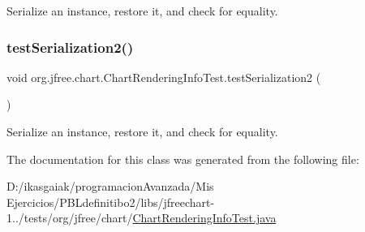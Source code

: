 Serialize an instance, restore it, and check for equality. \mbox{\label{classorg_1_1jfree_1_1chart_1_1_chart_rendering_info_test_a7c75384b4c62cd4f878f5f9768b7ec31}} 
\subsubsection{\texorpdfstring{test\+Serialization2()}{testSerialization2()}}
{\footnotesize\ttfamily void org.\+jfree.\+chart.\+Chart\+Rendering\+Info\+Test.\+test\+Serialization2 (\begin{DoxyParamCaption}{ }\end{DoxyParamCaption})}

Serialize an instance, restore it, and check for equality. 

The documentation for this class was generated from the following file\+:\begin{DoxyCompactItemize}
\item 
D\+:/ikasgaiak/programacion\+Avanzada/\+Mis Ejercicios/\+P\+B\+Ldefinitibo2/libs/jfreechart-\/1../tests/org/jfree/chart/\mbox{\hyperlink{_chart_rendering_info_test_8java}{Chart\+Rendering\+Info\+Test.\+java}}\end{DoxyCompactItemize}
